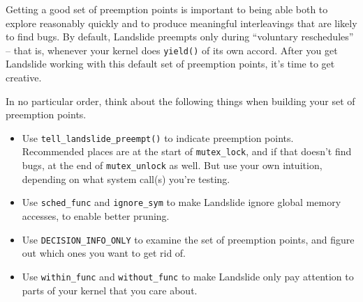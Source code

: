 \documentclass{article}
\begin{document}
Getting a good set of preemption points is important to being able both to explore reasonably quickly and to produce meaningful interleavings that are likely to find bugs. By default, Landslide preempts only during ``voluntary reschedules'' -- that is, whenever your kernel does \texttt{yield()} of its own accord. After you get Landslide working with this default set of preemption points, it's time to get creative.

In no particular order, think about the following things when building your set of preemption points.

\begin{itemize}
	\item Use \texttt{tell\_landslide\_preempt()} to indicate preemption points. Recommended places are at the start of \texttt{mutex\_lock}, and if that doesn't find bugs, at the end of \texttt{mutex\_unlock} as well. But use your own intuition, depending on what system call(s) you're testing.
	\item Use \texttt{sched\_func} and \texttt{ignore\_sym} to make Landslide ignore global memory accesses, to enable better pruning.
	\item Use \texttt{DECISION\_INFO\_ONLY} to examine the set of preemption points, and figure out which ones you want to get rid of.
	\item Use \texttt{within\_func} and \texttt{without\_func} to make Landslide only pay attention to parts of your kernel that you care about.
\end{itemize}

\end{document}
